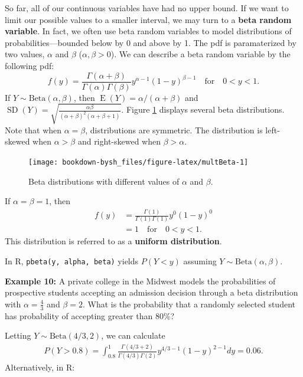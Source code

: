 \documentclass[
]{krantz}
\newcommand{\E}{\operatorname{E}}
\newcommand{\SD}{\operatorname{SD}}
\begin{document}
So far, all of our continuous variables have had no upper bound. If we want to limit our possible values to a smaller interval, we may turn to a \textbf{beta random variable}. In fact, we often use beta random variables to model distributions of probabilities---bounded below by 0 and above by 1. The pdf is paramaterized by two values, \(\alpha\) and \(\beta\) (\(\alpha, \beta > 0\)). We can describe a beta random variable by the following pdf:
\begin{equation}
f(y) = \frac{\Gamma(\alpha + \beta)}{\Gamma(\alpha)\Gamma(\beta)} y^{\alpha-1} (1-y)^{\beta-1} \quad \textrm{for} \quad 0 < y < 1.
\label{eq:betaRV}
\end{equation}
If \(Y \sim \textrm{Beta}(\alpha, \beta)\), then \(\E(Y) = \alpha/(\alpha + \beta)\) and \(\SD(Y) = \displaystyle \sqrt{\frac{\alpha \beta}{(\alpha + \beta)^2 (\alpha+\beta+1)}}\). Figure \ref{fig:multBeta} displays several beta distributions. Note that when \(\alpha = \beta\), distributions are symmetric. The distribution is left-skewed when \(\alpha > \beta\) and right-skewed when \(\beta > \alpha\).



\begin{figure}

{\centering \texttt{[image: bookdown-bysh\_files/figure-latex/multBeta-1]} 

}

\caption{Beta distributions with different values of \(\alpha\) and \(\beta\).}\label{fig:multBeta}
\end{figure}

If \(\alpha = \beta = 1\), then
\begin{align*}
 f(y) &= \frac{\Gamma(1)}{\Gamma(1)\Gamma(1)}y^0(1-y)^0 \\
      &= 1 \quad \textrm{for} \quad 0 < y < 1.
\end{align*}
This distribution is referred to as a \textbf{uniform distribution}.

In R, \texttt{pbeta(y,\ alpha,\ beta)} yields \(P(Y < y)\) assuming \(Y \sim \textrm{Beta}(\alpha, \beta)\).

\textbf{Example 10:} A private college in the Midwest models the probabilities of prospective students accepting an admission decision through a beta distribution with \(\alpha = \frac{4}{3}\) and \(\beta = 2\). What is the probability that a randomly selected student has probability of accepting greater than 80\%?

Letting \(Y \sim \textrm{Beta}(4/3,2)\), we can calculate
\begin{align*} 
P(Y > 0.8) = \int_{0.8}^1 \frac{\Gamma(4/3 + 2)}{\Gamma(4/3)\Gamma(2)} y^{4/3-1} (1-y)^{2-1}dy = 0.06.
\end{align*}
Alternatively, in R:
\end{document}
